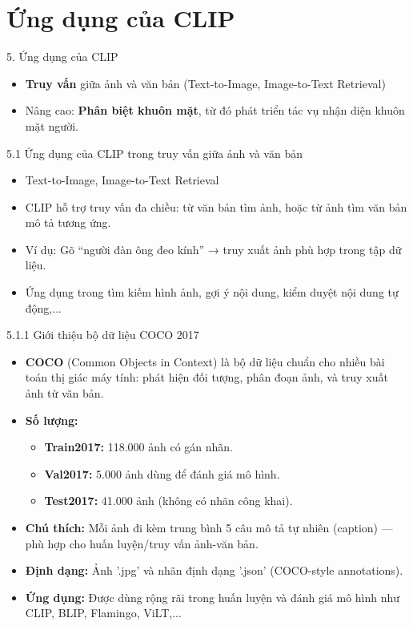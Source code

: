 \section{Ứng dụng của CLIP}
\begin{frame}{5. Ứng dụng của CLIP}
\begin{itemize}
    \item \textbf{Truy vấn} giữa ảnh và văn bản (Text-to-Image, Image-to-Text Retrieval)
    \item Nâng cao: \textbf{Phân biệt khuôn mặt}, từ đó phát triển tác vụ nhận diện khuôn mặt người.
\end{itemize}
\end{frame}

\begin{frame}{5.1 Ứng dụng của CLIP trong truy vấn giữa ảnh và văn bản}
\begin{itemize}
    \item Text-to-Image, Image-to-Text Retrieval
    \item CLIP hỗ trợ truy vấn đa chiều: từ văn bản tìm ảnh, hoặc từ ảnh tìm văn bản mô tả tương ứng.
    \item Ví dụ: Gõ “người đàn ông đeo kính” → truy xuất ảnh phù hợp trong tập dữ liệu.
    \item Ứng dụng trong tìm kiếm hình ảnh, gợi ý nội dung, kiểm duyệt nội dung tự động,...
\end{itemize}
\end{frame}

\begin{frame}{5.1.1 Giới thiệu bộ dữ liệu COCO 2017}
\begin{itemize}
    \item \textbf{COCO} (Common Objects in Context) là bộ dữ liệu chuẩn cho nhiều bài toán thị giác máy tính: phát hiện đối tượng, phân đoạn ảnh, và truy xuất ảnh từ văn bản.
    
    \item \textbf{Số lượng:}
    \begin{itemize}
        \item \textbf{Train2017:} 118.000 ảnh có gán nhãn.
        \item \textbf{Val2017:} 5.000 ảnh dùng để đánh giá mô hình.
        \item \textbf{Test2017:} 41.000 ảnh (không có nhãn công khai).
    \end{itemize}

    \item \textbf{Chú thích:} Mỗi ảnh đi kèm trung bình 5 câu mô tả tự nhiên (caption) — phù hợp cho huấn luyện/truy vấn ảnh-văn bản.

    \item \textbf{Định dạng:} Ảnh '.jpg' và nhãn định dạng '.json' (COCO-style annotations).

    \item \textbf{Ứng dụng:} Được dùng rộng rãi trong huấn luyện và đánh giá mô hình như CLIP, BLIP, Flamingo, ViLT,...
\end{itemize}
\end{frame}

